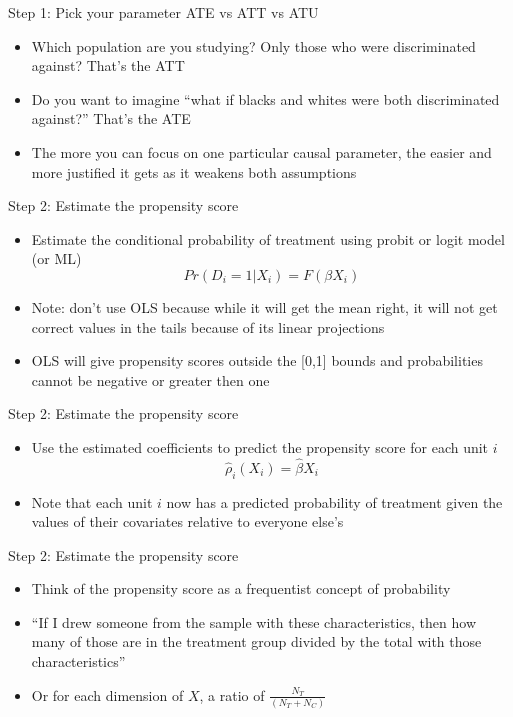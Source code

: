 \documentclass{beamer}
\begin{document}
\begin{frame}{Step 1: Pick your parameter ATE vs ATT vs ATU}

\begin{itemize}
	\item Which population are you studying?  Only those who were discriminated against?  That's the ATT
	\item Do you want to imagine ``what if blacks and whites were both discriminated against?'' That's the ATE
	\item The more you can focus on one particular causal parameter, the easier and more justified it gets as it weakens both assumptions
\end{itemize}

\end{frame}


\begin{frame}{Step 2: Estimate the propensity score}

		\begin{itemize}
		\item Estimate the conditional probability of treatment using probit or logit model (or ML) $$Pr(D_i=1|X_i) = F(\beta X_i)$$
			\item Note: don't use OLS because while it will get the mean right, it will not get correct values in the tails because of its linear projections
			\item OLS will give propensity scores outside the [0,1] bounds and probabilities cannot be negative or greater then one
		\end{itemize}
\end{frame}

\begin{frame}{Step 2: Estimate the propensity score}

		\begin{itemize}
		\item Use the estimated coefficients to predict the propensity score for each unit $i$$$\widehat{\rho}_i(X_i) = \widehat{\beta} X_i$$
		\item Note that each unit $i$ now has a predicted probability of treatment given the values of their covariates relative to everyone else's 
		\end{itemize}
\end{frame}



\begin{frame}{Step 2: Estimate the propensity score}

\begin{itemize}
\item Think of the propensity score as a frequentist concept of probability
\item ``If I drew someone from the sample with these characteristics, then how many of those are in the treatment group divided by the total with those characteristics'' 
\item Or for each dimension of $X$, a ratio of $\frac{N_T}{(N_T + N_C)}$

\end{itemize}

\end{frame}
\end{document}

